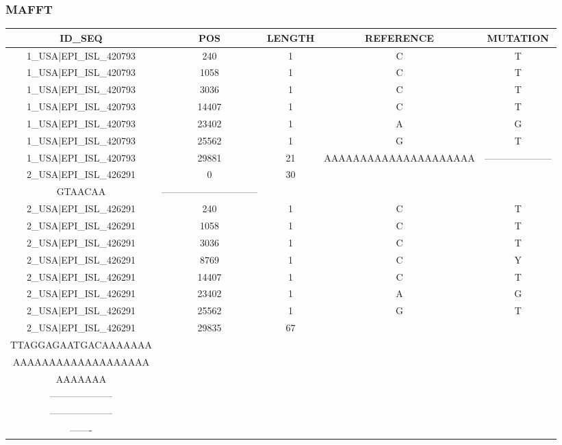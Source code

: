 \documentclass[a4paper,10pt]{article}
\begin{document}
\newpage
\subsubsection{MAFFT}

\begin{longtable}{@{}ccccc@{}}
\toprule
\textbf{ID\_SEQ} & \textbf{POS} & \textbf{LENGTH} & \textbf{REFERENCE} & \textbf{MUTATION} \\* \midrule
\endfirsthead
%
\cline{1-5}
\endhead
%
1\_USA|EPI\_ISL\_420793 & 240 & 1 & C & T \\* \midrule
1\_USA|EPI\_ISL\_420793 & 1058 & 1 & C & T \\* \midrule
1\_USA|EPI\_ISL\_420793 & 3036 & 1 & C & T \\* \midrule
1\_USA|EPI\_ISL\_420793 & 14407 & 1 & C & T \\* \midrule
1\_USA|EPI\_ISL\_420793 & 23402 & 1 & A & G \\* \midrule
1\_USA|EPI\_ISL\_420793 & 25562 & 1 & G & T \\* \midrule
1\_USA|EPI\_ISL\_420793 & 29881 & 21 & AAAAAAAAAAAAAAAAAAAAA & --------------------- \\* \midrule
2\_USA|EPI\_ISL\_426291 & 0 & 30 & \begin{tabular}[c]{@{}c@{}}ATTAAAGGTTTATACCTTCCCAG\\ GTAACAA\end{tabular} & ------------------------------ \\* \midrule
2\_USA|EPI\_ISL\_426291 & 240 & 1 & C & T \\* \midrule
2\_USA|EPI\_ISL\_426291 & 1058 & 1 & C & T \\* \midrule
2\_USA|EPI\_ISL\_426291 & 3036 & 1 & C & T \\* \midrule
2\_USA|EPI\_ISL\_426291 & 8769 & 1 & C & Y \\* \midrule
2\_USA|EPI\_ISL\_426291 & 14407 & 1 & C & T \\* \midrule
2\_USA|EPI\_ISL\_426291 & 23402 & 1 & A & G \\* \midrule
2\_USA|EPI\_ISL\_426291 & 25562 & 1 & G & T \\* \midrule
2\_USA|EPI\_ISL\_426291 & 29835 & 67 & \begin{tabular}[c]{@{}c@{}}CCATGTGATTTTAATAGCTTC\\ TTAGGAGAATGACAAAAAAA\\ AAAAAAAAAAAAAAAAAAA\\ AAAAAAA\end{tabular} & \begin{tabular}[c]{@{}c@{}}--------------------\\ --------------------\\ --------------------\\ -------\end{tabular} \\* \midrule

\end{longtable}
\end{document}
